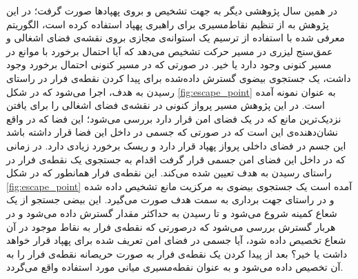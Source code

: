 
در همین سال پژوهشی دیگر به جهت تشخیص و  بروی پهپادها صورت گرفت؛ در این پژوهش به از تنظیم نقاط‌مسیری برای راهبری پهپاد استفاده کرده است، الگوریتم معرفی شده با استفاده از ترسیم یک استوانه‌ی مجازی بروی نقشه‌ی فضای اشغالی و عمق‌سنج لیزری در مسیر حرکت تشخیص می‌دهد که آیا احتمال برخورد با موانع در مسیر کنونی وجود دارد یا خیر. در صورتی که در مسیر کنونی احتمال برخورد وجود داشت، یک جستجوی بیضوی گسترش داده‌شده برای پیدا کردن نقطه‌ی فرار در راستای رسیدن به هدف، اجرا می‌شود که در شکل \ref{fig:escape_point} به عنوان نمونه آمده است. در این پژوهش مسیر پرواز کنونی در نقشه‌ی فضای اشغالی را برای یافتن نزدیک‌ترین مانع که در یک فضای امن قرار دارد بررسی می‌شود؛ این فضا که در واقع نشان‌دهنده‌ی این است که در صورتی که جسمی در داخل این فضا قرار داشته باشد این جسم در فضای داخلی پرواز پهپاد قرار دارد و ریسک برخورد زیادی دارد. در زمانی که در داخل این فضای امن جسمی قرار گرفت اقدام به جستجوی یک نقطه‌ی فرار در راستای رسیدن به هدف تعیین شده می‌کند. این نقطه‌ی فرار همانطور که در شکل \ref{fig:escape_point} آمده است یک جستجوی بیضوی به مرکزیت مانع تشخیص داده شده و در راستای جهت برداری به سمت هدف صورت می‌گیرد. این بیضی جستجو از یک شعاع کمینه شروع می‌شود و تا رسیدن به حداکثر مقدار گسترش داده می‌شود و در هربار گسترش بررسی می‌شود که درصورتی که نقطه‌ی فرار به نقاط موجود در آن شعاع تخصیص داده شود، آیا جسمی در فضای امن تعریف شده برای پهپاد قرار خواهد داشت یا خیر؟ بعد از پیدا کردن یک نقطه‌ی فرار به صورت حریصانه نقطه‌ی فرار را به آن تخصیص داده می‌شود و به عنوان نقطه‌‌مسیری میانی مورد استفاده واقع می‌گردد.

